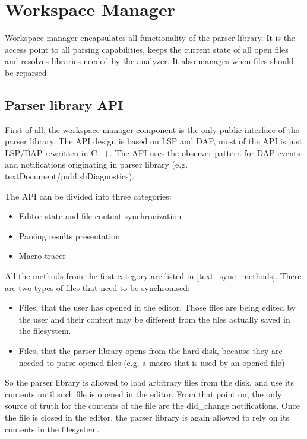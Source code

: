 \chapter{Workspace Manager}

Workspace manager encapsulates all functionality of the parser library. It is the access point to all parsing capabilities, keeps the current state of all open files and resolves libraries needed by the analyzer. It also manages when files should be reparsed.

\section{Parser library API}

First of all, the workspace manager component is the only public interface of the parser library. The API design is based on LSP and DAP, most of the API is just LSP/DAP rewritten in C++. The API uses the observer pattern for DAP events and notifications originating in parser library (e.g. textDocument/publishDiagnostics).

The API can be divided into three categories:
\begin{itemize}
	\item Editor state and file content synchronization
	\item Parsing results presentation 
	\item Macro tracer
\end{itemize}

All the methods from the first category are listed in \cref{text_sync_methods}. There are two types of files that need to be synchronised:
\begin{itemize}
	\item Files, that the user has opened in the editor. Those files are being edited by the user and their content may be different from the files actually saved in the filesystem.
	\item Files, that the parser library opens from the hard disk, because they are needed to parse opened files (e.g. a macro that is used by an opened file)
\end{itemize}

So the parser library is allowed to load arbitrary files from the disk, and use its contents until such file is opened in the editor. From that point on, the only source of truth for the contents of the file are the did\_change notifications. Once the file is closed in the editor, the parser library is again allowed to rely on its contents in the filesystem.







